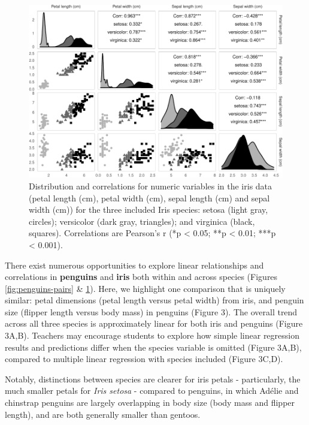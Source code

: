 \begin{Schunk}
\begin{figure}
\includegraphics{penguins_files/figure-latex/iris-pairs-1} \caption[Distribution and correlations for numeric variables in the iris data (petal length (cm), petal width (cm), sepal length (cm) and sepal width (cm)) for the three included Iris species]{Distribution and correlations for numeric variables in the iris data (petal length (cm), petal width (cm), sepal length (cm) and sepal width (cm)) for the three included Iris species: setosa (light gray, circles); versicolor (dark gray, triangles); and virginica (black, squares). Correlations are Pearson's r (*p < 0.05; **p < 0.01; ***p < 0.001).}\label{fig:iris-pairs}
\end{figure}
\end{Schunk}

There exist numerous opportunities to explore linear relationships and
correlations in \textbf{penguins} and \textbf{iris} both within and
across species (Figures \ref{fig:penguins-pairs} \&
\ref{fig:iris-pairs}). Here, we highlight one comparison that is
uniquely similar: petal dimensions (petal length versus petal width)
from iris, and penguin size (flipper length versus body mass) in
penguins (Figure 3). The overall trend across all three species is
approximately linear for both iris and penguins (Figure 3A,B). Teachers
may encourage students to explore how simple linear regression results
and predictions differ when the species variable is omitted (Figure
3A,B), compared to multiple linear regression with species included
(Figure 3C,D).

Notably, distinctions between species are clearer for iris petals -
particularly, the much smaller petals for \emph{Iris setosa} - compared
to penguins, in which Adélie and chinstrap penguins are largely
overlapping in body size (body mass and flipper length), and are both
generally smaller than gentoos.


